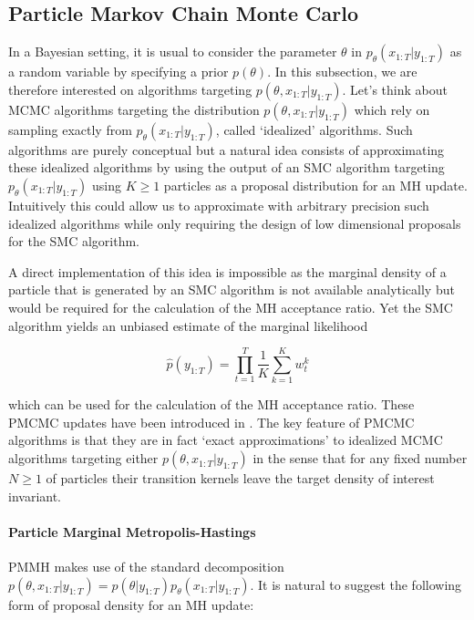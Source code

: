 \subsection{Particle Markov Chain Monte Carlo} \label{PMCMC}
In a Bayesian setting, it is usual to consider the parameter $\theta$ in $p_\theta(x_{1:T}|y_{1:T})$ as a random variable by specifying a prior $p(\theta)$. In this subsection, we are therefore interested on algorithms targeting
$p(\theta, x_{1:T}|y_{1:T})$.
Let's think about \gls{MCMC} algorithms targeting the distribution $p(\theta, x_{1:T}|y_{1:T})$ which rely on sampling exactly from $p_\theta(x_{1:T}|y_{1:T})$, called ‘idealized’ algorithms.
Such algorithms are purely conceptual but a natural idea consists of approximating these idealized algorithms by using the output of an \gls{SMC} algorithm targeting $p_\theta(x_{1:T}|y_{1:T})$ using $K \ge 1$ particles as a proposal distribution for an \gls{MH} update.
Intuitively this could allow us to approximate with arbitrary precision such idealized algorithms while only requiring the design of low dimensional proposals for the \gls{SMC} algorithm.

A direct implementation of this idea is impossible as the marginal density of a particle that is generated by an \gls{SMC} algorithm is not available analytically but would be required for the calculation of the \gls{MH} acceptance ratio. Yet the \gls{SMC} algorithm yields an unbiased estimate of the marginal likelihood

$$ \hat{p}(y_{1:T}) = \prod_{t=1}^T \frac{1}{K} \sum_{k=1}^K w_t^k $$

which can be used for the calculation of the \gls{MH} acceptance ratio. 
These \gls{PMCMC} updates have been introduced in \cite{Andrieu:2010gc}.
The key feature of PMCMC algorithms is that they are in fact ‘exact approximations’ to idealized \gls{MCMC} algorithms targeting either $p(\theta, x_{1:T}|y_{1:T})$ in the sense that for any fixed number $N\ge1$ of particles their transition kernels leave the target density of interest invariant. 


\paragraph{Particle Marginal Metropolis-Hastings}
\gls{PMMH} makes use of the standard decomposition $p(\theta, x_{1:T}|y_{1:T}) = p(\theta | y_{1:T}) p_\theta(x_{1:T}|y_{1:T})$. 
It is natural to suggest the following form of proposal density for an \gls{MH} update:

